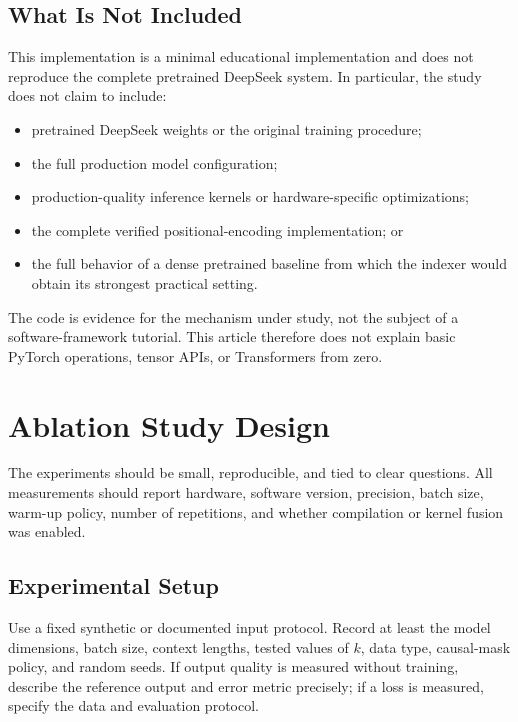 \documentclass[11pt]{article}
\begin{document}
\subsection{What Is Not Included}

This implementation is a minimal educational implementation and does not
reproduce the complete pretrained DeepSeek system. In particular, the study
does not claim to include:
\begin{itemize}[leftmargin=*]
    \item pretrained DeepSeek weights or the original training procedure;
    \item the full production model configuration;
    \item production-quality inference kernels or hardware-specific
          optimizations;
    \item the complete verified positional-encoding implementation; or
    \item the full behavior of a dense pretrained baseline from which the
          indexer would obtain its strongest practical setting.
\end{itemize}

The code is evidence for the mechanism under study, not the subject of a
software-framework tutorial. This article therefore does not explain basic
PyTorch operations, tensor APIs, or Transformers from zero.

\section{Ablation Study Design}

The experiments should be small, reproducible, and tied to clear questions.
All measurements should report hardware, software version, precision, batch
size, warm-up policy, number of repetitions, and whether compilation or kernel
fusion was enabled.

\subsection{Experimental Setup}

Use a fixed synthetic or documented input protocol. Record at least the model
dimensions, batch size, context lengths, tested values of $k$, data type,
causal-mask policy, and random seeds. If output quality is measured without
training, describe the reference output and error metric precisely; if a loss
is measured, specify the data and evaluation protocol.
\end{document}
